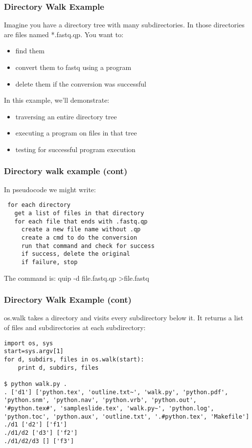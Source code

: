 \documentclass[10pt]{beamer}
\newcommand\smallfont{\fontsize{8pt}{7.2}\selectfont}
\begin{document}
\begin{frame}[fragile]
\frametitle{Directory Walk Example}

Imagine you have a directory tree with many subdirectories.  In
those directories are files named *.fastq.qp.  You want to:
\begin{itemize}
\item find them
\item convert them to fastq using a program
\item delete them if the conversion was successful
\end{itemize}

In this example, we'll demonstrate:

\begin{itemize}
\item traversing an entire directory tree
\item executing a program on files in that tree
\item testing for successful program execution
\end{itemize}

\end{frame}

\begin{frame}[fragile]
\frametitle{Directory walk example (cont)}
\smallfont
In pseudocode we might write:
\begin{verbatim}
 for each directory
   get a list of files in that directory
   for each file that ends with .fastq.qp
     create a new file name without .qp
     create a cmd to do the conversion
     run that command and check for success
     if success, delete the original
     if failure, stop
\end{verbatim}

The command is: quip -d file.fastq.qp \textgreater file.fastq 

\end{frame}

\begin{frame}[fragile]
\frametitle{Directory Walk Example (cont)}

os.walk takes a directory and visits every subdirectory below it.
It returns a list of files and subdirectories at each subdirectory:

\begin{verbatim}
import os, sys
start=sys.argv[1]
for d, subdirs, files in os.walk(start):
    print d, subdirs, files

$ python walk.py .
. ['d1'] ['python.tex', 'outline.txt~', 'walk.py', 'python.pdf', 'python.snm', 'python.nav', 'python.vrb', 'python.out', '#python.tex#', 'sampleslide.tex', 'walk.py~', 'python.log', 'python.toc', 'python.aux', 'outline.txt', '.#python.tex', 'Makefile']
./d1 ['d2'] ['f1']
./d1/d2 ['d3'] ['f2']
./d1/d2/d3 [] ['f3']

\end{verbatim}
\end{frame}
\end{document}
